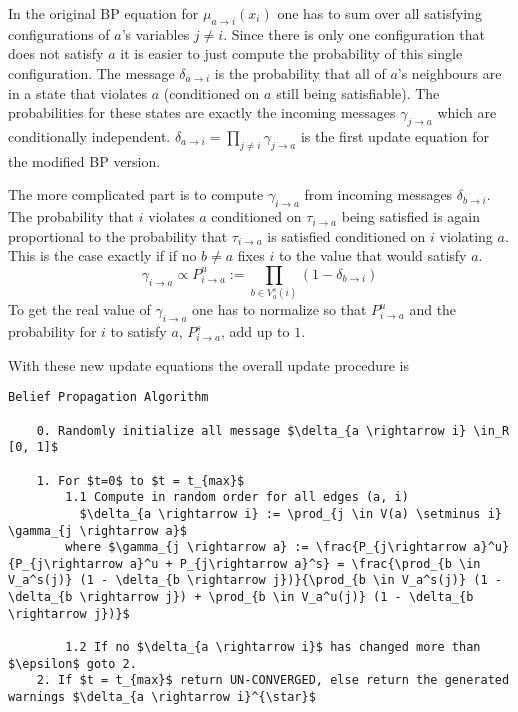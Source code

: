 In the original BP equation for $\mu_{a \rightarrow i}(x_i)$ one has to sum over all satisfying configurations of $a$'s variables $j \neq i$. Since there is only one configuration that does not satisfy $a$ it is easier to just compute the probability of this single configuration. The message $\delta_{a \rightarrow i}$ is the probability that all of $a$'s neighbours are in a state that violates $a$ (conditioned on $a$ still being satisfiable). The probabilities for these states are exactly the incoming messages $\gamma_{j \rightarrow a}$ which are conditionally independent.
$\delta_{a \rightarrow i} = \prod_{j \neq i} \gamma_{j \rightarrow a}$ is the first update equation for the modified BP version.

The more complicated part is to compute $\gamma_{i \rightarrow a}$ from incoming messages $\delta_{b \rightarrow i}$. The probability that $i$ violates $a$ conditioned on $\tau_{i \rightarrow a}$ being satisfied is again proportional to the probability  that $\tau_{i \rightarrow a}$ is satisfied conditioned on $i$ violating $a$. This is the case exactly if if no $b \neq a$ fixes $i$ to the value that would satisfy $a$.
$$\gamma_{i \rightarrow a} \propto P_{i \rightarrow a}^u := \prod_{b \in V_a^s(i)} (1 - \delta_{b \rightarrow i})$$
To get the real value of $\gamma_{i \rightarrow a}$ one has to normalize so that $P_{i \rightarrow a}^u$ and the probability for $i$ to satisfy $a$, $P_{i \rightarrow a}^s$, add up to $1$.

With these new update equations the overall update procedure is

\begin{lstlisting}[mathescape=true]
	Belief Propagation Algorithm
	
	0. Randomly initialize all message $\delta_{a \rightarrow i} \in_R [0, 1]$
	
	1. For $t=0$ to $t = t_{max}$
		1.1 Compute in random order for all edges (a, i)
		  $\delta_{a \rightarrow i} := \prod_{j \in V(a) \setminus i} \gamma_{j \rightarrow a}$		 
		where $\gamma_{j \rightarrow a} := \frac{P_{j\rightarrow a}^u}{P_{j\rightarrow a}^u + P_{j\rightarrow a}^s} = \frac{\prod_{b \in V_a^s(j)} (1 - \delta_{b \rightarrow j})}{\prod_{b \in V_a^s(j)} (1 - \delta_{b \rightarrow j}) + \prod_{b \in V_a^u(j)} (1 - \delta_{b \rightarrow j})}$
		 		
		1.2 If no $\delta_{a \rightarrow i}$ has changed more than $\epsilon$ goto 2.
	2. If $t = t_{max}$ return UN-CONVERGED, else return the generated warnings $\delta_{a \rightarrow i}^{\star}$
\end{lstlisting}

